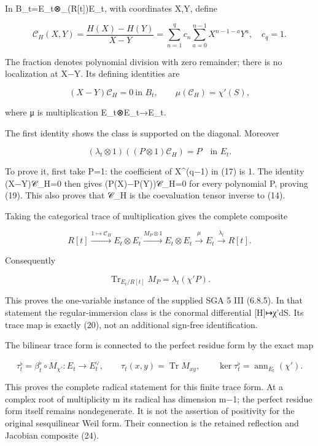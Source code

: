 In B\_t=E\_t⊗\_(R{[}t{]})E\_t, with coordinates X,Y, define

\[
\mathcal C_H(X,Y)=\frac{H(X)-H(Y)}{X-Y}
 =\sum_{n=1}^{q}c_n\sum_{a=0}^{n-1}X^{n-1-a}Y^a,
\quad c_q=1.
\tag{17}
\]

The fraction denotes polynomial division with zero remainder; there is no localization at X−Y. Its defining identities are

\[
(X-Y)\mathcal C_H=0\ \text{in }B_t,
\qquad \mu(\mathcal C_H)=\chi'(S),
\tag{18}
\]

where μ is multiplication E\_t⊗E\_t→E\_t.

The first identity shows the class is supported on the diagonal. Moreover

\[
(\lambda_t\otimes1)((P\otimes1)\mathcal C_H)=P
\quad\text{in }E_t.
\tag{19}
\]

To prove it, first take P=1: the coefficient of X\^{}(q−1) in (17) is 1. The identity (X−Y)𝒞\_H=0 then gives (P(X)−P(Y))𝒞\_H=0 for every polynomial P, proving (19). This also proves that 𝒞\_H is the coevaluation tensor inverse to (14).

Taking the categorical trace of multiplication gives the complete composite

\[
R[t]\xrightarrow{1\mapsto\mathcal C_H}E_t\otimes E_t
\xrightarrow{M_P\otimes1}E_t\otimes E_t
\xrightarrow{\mu}E_t\xrightarrow{\lambda_t}R[t].
\tag{20}
\]

Consequently

\[
\boxed{\operatorname{Tr}_{E_t/R[t]}M_P
 =\lambda_t(\chi'P).}
\tag{21}
\]

This proves the one-variable instance of the supplied SGA 5 III (6.8.5). In that statement the regular-immersion class is the conormal differential {[}H{]}↦χ'dS. Its trace map is exactly (20), not an additional sign-free identification.

The bilinear trace form is connected to the perfect residue form by the exact map

\[
\tau_t^\flat=\beta_t^\flat\circ M_{\chi'}:E_t\longrightarrow E_t^\vee,
\qquad \tau_t(x,y)=\operatorname{Tr}M_{xy},
\qquad \ker\tau_t^\flat=\operatorname{ann}_{E_t}(\chi').
\tag{21a}
\]

This proves the complete radical statement for this finite trace form. At a complex root of multiplicity m its radical has dimension m−1; the perfect residue form itself remains nondegenerate. It is not the assertion of positivity for the original sesquilinear Weil form. Their connection is the retained reflection and Jacobian composite (24).

